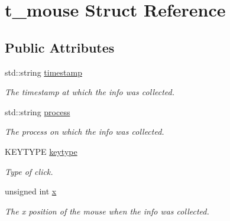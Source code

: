 \hypertarget{structt__mouse}{}\section{t\+\_\+mouse Struct Reference}
\label{structt__mouse}
\subsection*{Public Attributes}
\begin{DoxyCompactItemize}
\item 
\mbox{\label{structt__mouse_ad4a9cc684c5e668072a860f5a249b538}} 
std\+::string \hyperlink{structt__mouse_ad4a9cc684c5e668072a860f5a249b538}{timestamp}
\begin{DoxyCompactList}\small\item\em The timestamp at which the info was collected. \end{DoxyCompactList}\item 
\mbox{\label{structt__mouse_a3e244db37dfeacdb68f4fe459f803bc6}} 
std\+::string \hyperlink{structt__mouse_a3e244db37dfeacdb68f4fe459f803bc6}{process}
\begin{DoxyCompactList}\small\item\em The process on which the info was collected. \end{DoxyCompactList}\item 
\mbox{\label{structt__mouse_a0dbaab92c05cd9dde88b19712bae0eb2}} 
K\+E\+Y\+T\+Y\+PE \hyperlink{structt__mouse_a0dbaab92c05cd9dde88b19712bae0eb2}{keytype}
\begin{DoxyCompactList}\small\item\em Type of click. \end{DoxyCompactList}\item 
\mbox{\label{structt__mouse_a86301d081859d7424ef091644a47e90a}} 
unsigned int \hyperlink{structt__mouse_a86301d081859d7424ef091644a47e90a}{x}
\begin{DoxyCompactList}\small\item\em The x position of the mouse when the info was collected. \end{DoxyCompactList}\item 
\mbox{\label{structt__mouse_aa08a4efb666d232849ad00d40b284465}} 

\end{DoxyCompactItemize}
